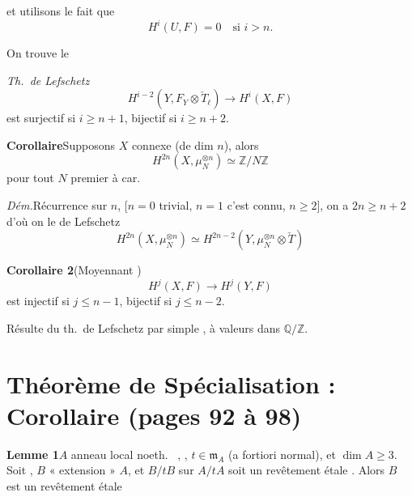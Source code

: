 \documentclass[11pt,a4paper]{article}
\begin{document}
et utilisons le fait que
\[
H^{i}(U,F) = 0 \quad \text{si } i > n .
\]

On trouve le

\emph{Th.\ de Lefschetz}
\[
H^{i-2}(Y, F_{Y} \otimes \check{T}_{\ell}) \longrightarrow H^{i}(X,F)
\]
est surjectif si $i \geqslant n+1$, bijectif si $i \geqslant n+2$.

\textbf{Corollaire}\quad Supposons $X$ connexe  (de dim $n$),
alors
\[
H^{2n}(X, \mu_{N}^{\otimes n}) \simeq \mathbb{Z}/N\mathbb{Z}
\]
pour tout \ill{} $N$ premier à  car.


\emph{Dém.}\quad Récurrence sur $n$, \ill{} \ill{} [$n = 0$ trivial, $n = 1$
c'est connu, \ill{} $n \geqslant 2$], on a \ill{} $2n \geqslant n+2$ d'où on
\ill{} \ill{} le \ill{} de Lefschetz
\[
H^{2n}(X, \mu_{N}^{\otimes n}) \simeq H^{2n-2}(Y, \mu_{N}^{\otimes n} \otimes
\check{T})
\]

\textbf{Corollaire 2}\quad (Moyennant \ill{})
\[
H^{j}(X,F) \longrightarrow H^{j}(Y,F)
\]
est injectif si $j \leqslant n-1$, bijectif si $j \leqslant n-2$.

Résulte du th.\ de Lefschetz  par simple
, à valeurs dans $\mathbb{Q}/\mathbb{Z}$.

\section*{Théorème de Spécialisation : Corollaire (pages 92 à 98)}


\textbf{Lemme 1}\quad $A$ anneau local noeth.\ \struck{\ill{}} , , $t \in \mathfrak{m}_{A}$
 
   (a fortiori
 normal), et $\dim A \geqslant 3$. Soit , $B$ « extension »   
$A$, et  $B/tB$ sur $A/tA$ soit \struck{\ill{}} un
revêtement étale  . Alors $B$
est un revêtement étale  \ill{}
\end{document}
